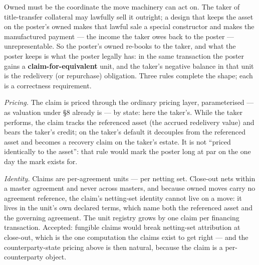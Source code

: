 Owned must be the coordinate the move machinery can act on. The taker of
title-transfer collateral may lawfully sell it outright; a design that keeps
the asset on the poster's owned makes that lawful sale a special constructor
and makes the manufactured payment --- the income the taker owes back to the
poster --- unrepresentable. So the poster's owned re-books to the taker, and
what the poster keeps is what the poster legally has: in the same transaction
the poster gains a \textbf{claim-for-equivalent} unit, and the taker's
negative balance in that unit is the redelivery (or repurchase) obligation.
Three rules complete the shape; each is a correctness requirement.

\emph{Pricing.} The claim is priced through the ordinary pricing layer,
parameterised --- as valuation under \S8 already is --- by state: here the
taker's. While the taker performs, the claim tracks the referenced asset (the
accrued redelivery value) and bears the taker's credit; on the taker's default
it decouples from the referenced asset and becomes a recovery claim on the
taker's estate. It is not ``priced identically to the asset'': that rule would
mark the poster long at par on the one day the mark exists for.

\emph{Identity.} Claims are per-agreement units --- per netting set. Close-out
nets within a master agreement and never across masters, and because owned
moves carry no agreement reference, the claim's netting-set identity cannot
live on a move: it lives in the unit's own declared terms, which name both the
referenced asset and the governing agreement. The unit registry grows by one
claim per financing transaction. Accepted: fungible claims would break
netting-set attribution at close-out, which is the one computation the claims
exist to get right --- and the counterparty-state pricing above is then
natural, because the claim is a per-counterparty object.

